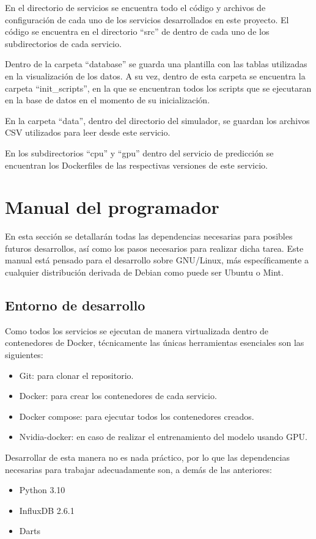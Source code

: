 En el directorio de servicios se encuentra todo el código y archivos de configuración de cada 
uno de los servicios desarrollados en este proyecto. El código se encuentra en el directorio
``src'' de dentro de cada uno de los subdirectorios de cada servicio. 

Dentro de la carpeta ``database'' se guarda una plantilla con las tablas utilizadas en la visualización 
de los datos. A su vez, dentro de esta carpeta se encuentra la carpeta ``init\_scripts'', en la que se encuentran 
todos los scripts que se ejecutaran en la base de datos en el momento de su inicialización.

En la carpeta ``data'', dentro del directorio del simulador, se guardan los archivos CSV utilizados para leer desde 
este servicio. 

En los subdirectorios ``cpu'' y ``gpu'' dentro del servicio de predicción se 
encuentran los Dockerfiles de las respectivas versiones de este servicio.

\section{Manual del programador}

En esta sección se detallarán todas las dependencias necesarias para posibles futuros desarrollos, así como
los pasos necesarios para realizar dicha tarea. Este manual está pensado para el desarrollo sobre GNU/Linux,
más específicamente a cualquier distribución derivada de Debian como puede ser Ubuntu o Mint.

\subsection{Entorno de desarrollo}

Como todos los servicios se ejecutan de manera virtualizada dentro de contenedores de Docker, técnicamente las 
únicas herramientas esenciales son las siguientes:
\begin{itemize}
    \item Git: para clonar el repositorio.
    \item Docker: para crear los contenedores de cada servicio.
    \item Docker compose: para ejecutar todos los contenedores creados.
    \item Nvidia-docker: en caso de realizar el entrenamiento del modelo usando GPU.
\end{itemize}

Desarrollar de esta manera no es nada práctico, por lo que las dependencias necesarias para trabajar adecuadamente son, 
a demás de las anteriores:
\begin{itemize}
    \item Python 3.10
    \item InfluxDB 2.6.1
    \item Darts
\end{itemize}

